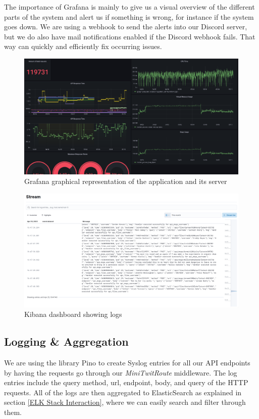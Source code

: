 \documentclass{article}
\begin{document}
The importance of Grafana is mainly to give us a visual overview of the different parts of the system and alert us if something is wrong, for instance if the system goes down. We are using a webhook to send the alerts into our Discord server, but we do also have mail notifications enabled if the Discord webhook fails. That way can quickly and efficiently fix occurring issues.

\begin{figure}[H]
    \centering
    \includegraphics[scale=0.8]{images/Grafana.png}
    \caption{Grafana graphical representation of the application and its server}
\end{figure}

\begin{figure}[H]
    \centering
    \includegraphics[scale=0.2]{images/kibana.png}
    \caption{Kibana dashboard showing logs}
\end{figure}


\subsection{Logging \& Aggregation}
We are using the library Pino to create Syslog entries for all our API endpoints by having the requests go through our \textit{MiniTwitRoute} middleware.
The log entries include the query method, url, endpoint, body, and query of the HTTP requests.
All of the logs are then aggregated to ElasticSearch as explained in section \ref{ELK Stack Interaction}, where we can easily search and filter through them.
\end{document}
